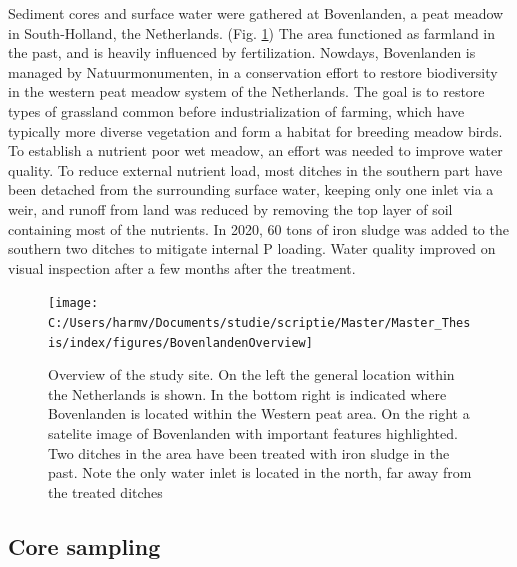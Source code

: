 \documentclass[a4paper,11pt]{article}
\begin{document}
Sediment cores and surface water were gathered at Bovenlanden, a peat meadow in South-Holland, the Netherlands. (Fig. \ref{fig:BL}) The area functioned as farmland in the past, and is heavily influenced by fertilization. Nowdays, Bovenlanden is managed by Natuurmonumenten, in a conservation effort to restore biodiversity in the western peat meadow system of the Netherlands. The goal is to restore types of grassland common before industrialization of farming, which have typically more diverse vegetation and form a habitat for breeding meadow birds. To establish a nutrient poor wet meadow, an effort was needed to improve water quality. To reduce external nutrient load, most ditches in the southern part have been detached from the surrounding surface water, keeping only one inlet via a weir, and runoff from land was reduced by removing the top layer of soil containing most of the nutrients. In 2020, 60 tons of iron sludge was added to the southern two ditches to mitigate internal P loading. Water quality improved on visual inspection after a few months after the treatment.
\begin{figure}

{\centering \texttt{[image: C:/Users/harmv/Documents/studie/scriptie/Master/Master\_Thesis/index/figures/BovenlandenOverview]} 

}

\caption{Overview of the study site. On the left  the general location within the Netherlands is shown. In the bottom right is indicated where Bovenlanden is located within the Western peat area. On the right a satelite image of Bovenlanden with important features highlighted. Two ditches in the area have been treated with iron sludge in the past. Note the only water inlet is located in the north, far away from the treated ditches}\label{fig:BL}
\end{figure}
\hypertarget{core-sampling}{%
\subsection{Core sampling}\label{core-sampling}}
\end{document}
